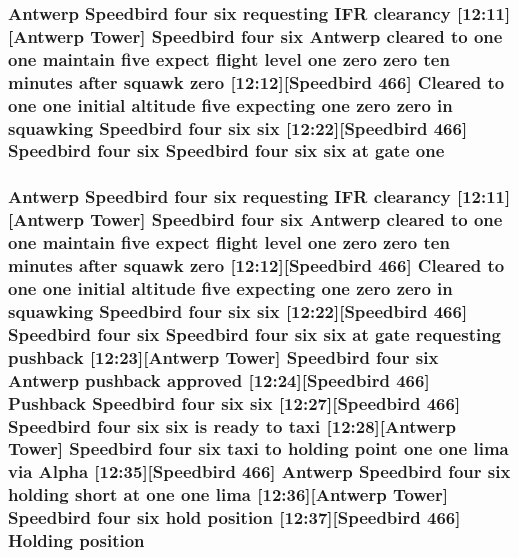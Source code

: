 \subsubsection[{\texorpdfstring{one}{one}}]{\setlength{\rightskip}{0pt plus 5cm}Antwerp Speedbird four {\bf six} requesting I\+FR clearancy \mbox{[}12\+:11\mbox{]}\mbox{[}Antwerp {\bf Tower}\mbox{]} Speedbird four {\bf six} Antwerp cleared to one one maintain five expect flight level one {\bf zero} {\bf zero} {\bf ten} minutes after squawk {\bf zero} \mbox{[}12\+:12\mbox{]}\mbox{[}Speedbird 466\mbox{]} Cleared to one one initial altitude five expecting one {\bf zero} {\bf zero} in {\bf squawking} Speedbird four {\bf six} {\bf six} \mbox{[}12\+:22\mbox{]}\mbox{[}Speedbird 466\mbox{]} Speedbird four {\bf six} Speedbird four {\bf six} {\bf six} at gate one}\hypertarget{happyDay5ExpectedATC_8txt_a1bdf675837626f29e859d1a241701d26}{}\label{happyDay5ExpectedATC_8txt_a1bdf675837626f29e859d1a241701d26}
\subsubsection[{\texorpdfstring{position}{position}}]{\setlength{\rightskip}{0pt plus 5cm}Antwerp Speedbird four {\bf six} requesting I\+FR clearancy \mbox{[}12\+:11\mbox{]}\mbox{[}Antwerp {\bf Tower}\mbox{]} Speedbird four {\bf six} Antwerp cleared to {\bf one} {\bf one} maintain five expect flight level {\bf one} {\bf zero} {\bf zero} {\bf ten} minutes after squawk {\bf zero} \mbox{[}12\+:12\mbox{]}\mbox{[}Speedbird 466\mbox{]} Cleared to {\bf one} {\bf one} initial altitude five expecting {\bf one} {\bf zero} {\bf zero} in {\bf squawking} Speedbird four {\bf six} {\bf six} \mbox{[}12\+:22\mbox{]}\mbox{[}Speedbird 466\mbox{]} Speedbird four {\bf six} Speedbird four {\bf six} {\bf six} at gate requesting pushback \mbox{[}12\+:23\mbox{]}\mbox{[}Antwerp {\bf Tower}\mbox{]} Speedbird four {\bf six} Antwerp pushback {\bf approved} \mbox{[}12\+:24\mbox{]}\mbox{[}Speedbird 466\mbox{]} Pushback Speedbird four {\bf six} {\bf six} \mbox{[}12\+:27\mbox{]}\mbox{[}Speedbird 466\mbox{]} Speedbird four {\bf six} {\bf six} is ready to taxi \mbox{[}12\+:28\mbox{]}\mbox{[}Antwerp {\bf Tower}\mbox{]} Speedbird four {\bf six} taxi to holding point {\bf one} {\bf one} {\bf lima} via {\bf Alpha} \mbox{[}12\+:35\mbox{]}\mbox{[}Speedbird 466\mbox{]} Antwerp Speedbird four {\bf six} holding short at {\bf one} {\bf one} {\bf lima} \mbox{[}12\+:36\mbox{]}\mbox{[}Antwerp {\bf Tower}\mbox{]} Speedbird four {\bf six} hold position \mbox{[}12\+:37\mbox{]}\mbox{[}Speedbird 466\mbox{]} Holding position}\hypertarget{happyDay5ExpectedATC_8txt_a6e8fa6f42e46ea0173f11b458c8b1193}{}\label{happyDay5ExpectedATC_8txt_a6e8fa6f42e46ea0173f11b458c8b1193}
